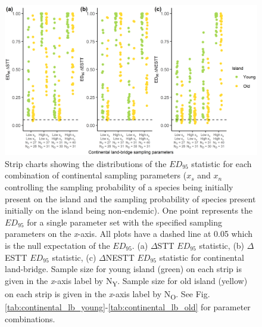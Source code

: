 \begin{figure}
    \centering
    \includegraphics{continental_land_bridge_sample_facet.png}
    \caption{Strip charts showing the distributions of the $ED_{95}$ statistic for each combination of continental sampling parameters ($x_s$ and $x_n$ controlling the sampling probability of a species being initially present on the island and the sampling probability of species present initially on the island being non-endemic). One point represents the $ED_{95}$ for a single parameter set with the specified sampling parameters on the \textit{x}-axis. All plots have a dashed line at 0.05 which is the null expectation of the $ED_{95}$. (a) $\Delta$STT $ED_{95}$ statistic, (b) $\Delta$ESTT $ED_{95}$ statistic, (c) $\Delta$NESTT $ED_{95}$ statistic for continental land-bridge. Sample size for young island (green) on each strip is given in the \textit{x}-axis label by N\textsubscript{Y}. Sample size for old island (yellow) on each strip is given in the \textit{x}-axis label by N\textsubscript{O}. See Fig. \ref{tab:continental_lb_young}-\ref{tab:continental_lb_old} for parameter combinations.}
    \label{fig:continental_land_bridge_sample_facet}
\end{figure}

